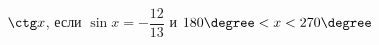 \begin{ex}[type=calculate]
	\begin{condition}
		\( \ctg x \), \quad если \( \sin x=-\dfrac{12}{13} \) и \( 180\degree<x<270\degree \)
	\end{condition}
\end{ex}